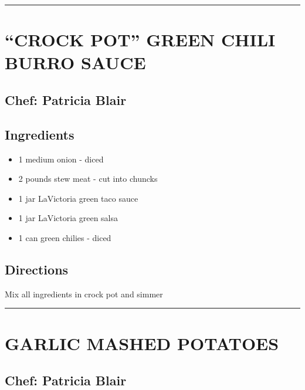 \documentclass[
]{book}
\providecommand{\tightlist}{%
  \setlength{\itemsep}{0pt}\setlength{\parskip}{0pt}}
\begin{document}
\begin{center}\rule{0.5\linewidth}{0.5pt}\end{center}

\hypertarget{crock-pot-green-chili-burro-sauce}{%
\section*{``CROCK POT'' GREEN CHILI BURRO SAUCE}\label{crock-pot-green-chili-burro-sauce}}


\hypertarget{chef-patricia-blair-7}{%
\subsection*{Chef: Patricia Blair}\label{chef-patricia-blair-7}}


\hypertarget{ingredients-29}{%
\subsection*{Ingredients}\label{ingredients-29}}


\begin{itemize}
\tightlist
\item
  1 medium onion - diced
\item
  2 pounds stew meat - cut into chuncks
\item
  1 jar LaVictoria green taco sauce
\item
  1 jar LaVictoria green salsa
\item
  1 can green chilies - diced
\end{itemize}

\hypertarget{directions-29}{%
\subsection*{Directions}\label{directions-29}}


Mix all ingredients in crock pot and simmer

\begin{center}\rule{0.5\linewidth}{0.5pt}\end{center}

\hypertarget{garlic-mashed-potatoes}{%
\section*{GARLIC MASHED POTATOES}\label{garlic-mashed-potatoes}}


\hypertarget{chef-patricia-blair-8}{%
\subsection*{Chef: Patricia Blair}\label{chef-patricia-blair-8}}
\end{document}
